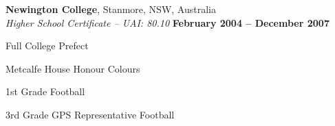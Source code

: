 \documentclass[margin,line]{resume}
\begin{document}
\begin{resume}
    \textbf{Newington College}, Stanmore, NSW, Australia \vspace{2mm}\\\vspace{1mm}%
    \textsl{Higher School Certificate -- UAI: 80.10} \hfill \textbf{February 2004 -- December 2007}\vspace{-3mm}\\\vspace{-1mm}%
    \begin{list2}
        \item Full College Prefect 
        \item Metcalfe House Honour Colours
	\item 1st Grade Football
	\item 3rd Grade GPS Representative Football 
    \end{list2}\vspace{-1.5mm}







\end{resume}
\end{document}
